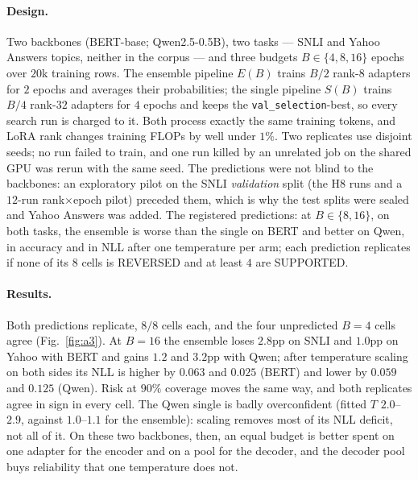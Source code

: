 \documentclass[11pt]{article}
\begin{document}
\paragraph{Design.} Two backbones (BERT-base; Qwen2.5-0.5B), two tasks --- SNLI and Yahoo Answers topics, neither in the corpus --- and three budgets $B{\in}\{4,8,16\}$ epochs over $20$k training rows. The ensemble pipeline $E(B)$ trains $B/2$ rank-$8$ adapters for $2$ epochs and averages their probabilities; the single pipeline $S(B)$ trains $B/4$ rank-$32$ adapters for $4$ epochs and keeps the \texttt{val\_selection}-best, so every search run is charged to it. Both process exactly the same training tokens, and LoRA rank changes training FLOPs by well under $1\%$. Two replicates use disjoint seeds; no run failed to train, and one run killed by an unrelated job on the shared GPU was rerun with the same seed. The predictions were not blind to the backbones: an exploratory pilot on the SNLI \emph{validation} split (the H8 runs and a $12$-run rank$\times$epoch pilot) preceded them, which is why the test splits were sealed and Yahoo Answers was added. The registered predictions: at $B{\in}\{8,16\}$, on both tasks, the ensemble is worse than the single on BERT and better on Qwen, in accuracy and in NLL after one temperature per arm; each prediction replicates if none of its $8$ cells is REVERSED and at least $4$ are SUPPORTED.

\paragraph{Results.} Both predictions replicate, $8/8$ cells each, and the four unpredicted $B{=}4$ cells agree (Fig.~\ref{fig:a3}). At $B{=}16$ the ensemble loses $2.8$pp on SNLI and $1.0$pp on Yahoo with BERT and gains $1.2$ and $3.2$pp with Qwen; after temperature scaling on both sides its NLL is higher by $0.063$ and $0.025$ (BERT) and lower by $0.059$ and $0.125$ (Qwen). Risk at $90\%$ coverage moves the same way, and both replicates agree in sign in every cell. The Qwen single is badly overconfident (fitted $T$ $2.0$--$2.9$, against $1.0$--$1.1$ for the ensemble): scaling removes most of its NLL deficit, not all of it. On these two backbones, then, an equal budget is better spent on one adapter for the encoder and on a pool for the decoder, and the decoder pool buys reliability that one temperature does not.
\end{document}

